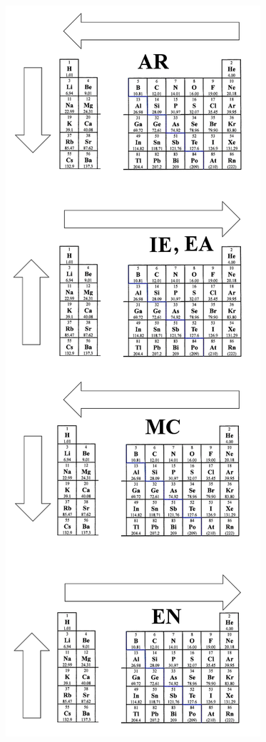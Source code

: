 \documentclass[main.tex]{subfiles}
\begin{document}
\begin{description}
\begin{marginfigure}
   \includegraphics[width=1\linewidth,scale=0.25]{chapter3/figure1-7}

\end{marginfigure}
\end{description}
\end{document}
